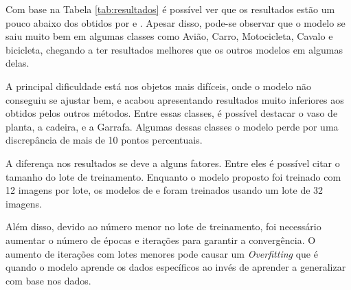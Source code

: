 Com base na Tabela \ref{tab:resultados} é possível ver que os resultados estão um pouco abaixo dos obtidos por  e . Apesar disso, pode-se observar que o modelo se saiu muito bem em algumas classes como Avião, Carro, Motocicleta, Cavalo e bicicleta, chegando a ter resultados melhores que os outros modelos em algumas delas.

A principal dificuldade está nos objetos mais difíceis, onde o modelo não conseguiu se ajustar bem, e acabou apresentando resultados muito inferiores aos obtidos pelos outros métodos. Entre essas classes, é possível destacar o vaso de planta, a cadeira, e a Garrafa. Algumas dessas classes o modelo perde por uma discrepância de mais de 10 pontos percentuais.

A diferença nos resultados se deve a alguns fatores. Entre eles é possível citar o tamanho do lote de treinamento. Enquanto o modelo proposto foi treinado com 12 imagens por lote, os modelos de  e  foram treinados usando um lote de 32 imagens. 

Além disso, devido ao número menor no lote de treinamento, foi necessário aumentar o número de épocas e iterações para garantir a convergência. O aumento de iterações com lotes menores pode causar um \textit{Overfitting} que é quando o modelo aprende os dados específicos ao invés de aprender a generalizar com base nos dados.


